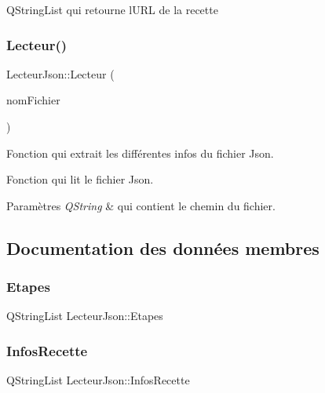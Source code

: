 Q\+String\+List qui retourne l\textquotesingle{}U\+RL de la recette \mbox{\label{class_lecteur_json_a6b74dbecd8cb87168fb2d36bc1a22f2b}} 
\subsubsection{\texorpdfstring{Lecteur()}{Lecteur()}}
{\footnotesize\ttfamily Lecteur\+Json\+::\+Lecteur (\begin{DoxyParamCaption}\item[{Q\+String}]{nom\+Fichier }\end{DoxyParamCaption})}



Fonction qui extrait les différentes infos du fichier Json. 

Fonction qui lit le fichier Json.


\begin{DoxyParams}{Paramètres}
{\em Q\+String} & qui contient le chemin du fichier. \\
\hline
\end{DoxyParams}


\subsection{Documentation des données membres}
\mbox{\label{class_lecteur_json_a9328054d9a7e7f446cb047cab54c7b45}} 
\subsubsection{\texorpdfstring{Etapes}{Etapes}}
{\footnotesize\ttfamily Q\+String\+List Lecteur\+Json\+::\+Etapes\hspace{0.3cm}{\ttfamily [private]}}

\mbox{\label{class_lecteur_json_a567a5bb99e9883f7906a89a46e322495}} 
\subsubsection{\texorpdfstring{Infos\+Recette}{InfosRecette}}
{\footnotesize\ttfamily Q\+String\+List Lecteur\+Json\+::\+Infos\+Recette\hspace{0.3cm}{\ttfamily [private]}}

